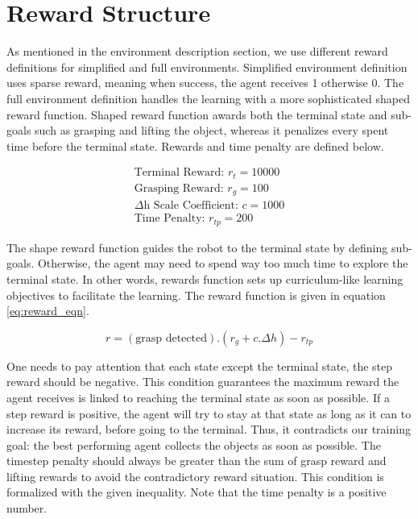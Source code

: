 \section{Reward Structure}

As mentioned in the environment description section, we use different reward definitions for simplified and full environments. Simplified environment definition uses sparse reward, meaning when success, the agent receives 1 otherwise 0. The full environment definition handles the learning with a more sophisticated shaped reward function. 
Shaped reward function awards both the terminal state and sub-goals such as grasping and lifting the object, whereas it penalizes every spent time before the terminal state. Rewards and time penalty are defined below.

\begin{align*}
    \text{Terminal Reward: } r_t = 10000 \\
    \text{Grasping Reward: } r_g = 100 \\
    \text{\(\Delta\)h Scale Coefficient: } c = 1000 \\
    \text{Time Penalty: } r_{tp} = 200
\end{align*}


The shape reward function guides the robot to the terminal state by defining sub-goals. Otherwise, the agent may need to spend way too much time to explore the terminal state. In other words, rewards function sets up curriculum-like learning objectives to facilitate the learning. The reward function is given in equation \ref{eq:reward_eqn}. 

\begin{equation}
    r = (\text{grasp detected}).(r_g + c. \Delta h) - r_{tp}
    \label{eq:reward_eqn}    
\end{equation}


One needs to pay attention that each state except the terminal state, the step reward should be negative. This condition guarantees the maximum reward the agent receives is linked to reaching the terminal state as soon as possible. If a step reward is positive, the agent will try to stay at that state as long as it can to increase its reward, before going to the terminal. Thus, it contradicts our training goal: the best performing agent collects the objects as soon as possible. The timestep penalty should always be greater than the sum of grasp reward and lifting rewards to avoid the contradictory reward situation. This condition is formalized with the given inequality. Note that the time penalty is a positive number.

